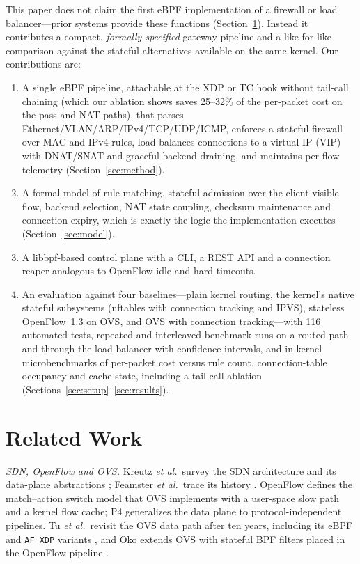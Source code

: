 \documentclass[conference]{IEEEtran}
\begin{document}
This paper does not claim the first eBPF implementation of a firewall or load
balancer---prior systems provide these functions (Section~\ref{sec:related}). Instead it
contributes a compact, \emph{formally specified} gateway pipeline and a
like-for-like comparison against the stateful alternatives available on the
same kernel. Our contributions are:
\begin{enumerate}
\item A single eBPF pipeline, attachable at the XDP or TC hook without
tail-call chaining (which our ablation shows saves 25--32\% of the
per-packet cost on the pass and NAT paths), that parses Ethernet/VLAN/ARP/IPv4/TCP/UDP/ICMP, enforces
a stateful firewall over MAC and IPv4 rules, load-balances connections to a
virtual IP (VIP) with DNAT/SNAT and graceful backend draining, and maintains
per-flow telemetry (Section~\ref{sec:method}).
\item A formal model of rule matching, stateful admission over the
client-visible flow, backend selection, NAT state coupling, checksum
maintenance and connection expiry, which is exactly the logic the
implementation executes (Section~\ref{sec:model}).
\item A libbpf-based control plane with a CLI, a REST API and a connection
reaper analogous to OpenFlow idle and hard timeouts.
\item An evaluation against four baselines---plain kernel routing, the
kernel's native stateful subsystems (nftables with connection tracking and
IPVS), stateless OpenFlow~1.3 on OVS, and OVS with connection tracking---with
116 automated tests, repeated and interleaved benchmark runs on a routed
path and through the load balancer with confidence intervals, and in-kernel
microbenchmarks of per-packet cost versus rule count, connection-table
occupancy and cache state, including a tail-call ablation (Sections~\ref{sec:setup}--\ref{sec:results}).
\end{enumerate}

\section{Related Work}
\label{sec:related}
\textit{SDN, OpenFlow and OVS.} Kreutz \textit{et al.}\ survey the SDN
architecture and its data-plane abstractions \cite{kreutz2015sdn}; Feamster
\textit{et al.}\ trace its history \cite{feamster2014road}. OpenFlow
\cite{mckeown2008openflow} defines the match--action switch model that OVS
\cite{pfaff2015ovs} implements with a user-space slow path and a kernel flow
cache; P4 \cite{bosshart2014p4} generalizes the data plane to
protocol-independent pipelines. Tu \textit{et al.}\ revisit the OVS data path
after ten years, including its eBPF and \texttt{AF\_XDP} variants \cite{tu2021ovs}, and
Oko extends OVS with stateful BPF filters placed in the OpenFlow pipeline
\cite{chaignon2018oko}.
\end{document}
